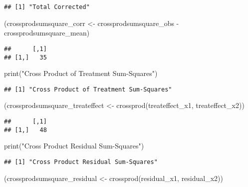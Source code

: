 \documentclass[
]{article}
\newenvironment{Shaded}{\begin{snugshade}}{\end{snugshade}}
\newcommand{\FunctionTok}[1]{\textcolor[rgb]{0.00,0.00,0.00}{#1}}
\newcommand{\NormalTok}[1]{#1}
\newcommand{\OtherTok}[1]{\textcolor[rgb]{0.56,0.35,0.01}{#1}}
\newcommand{\SpecialCharTok}[1]{\textcolor[rgb]{0.00,0.00,0.00}{#1}}
\newcommand{\StringTok}[1]{\textcolor[rgb]{0.31,0.60,0.02}{#1}}
\begin{document}
\begin{verbatim}
## [1] "Total Corrected"
\end{verbatim}

\begin{Shaded}
\begin{Highlighting}[]
\NormalTok{(crossprodsumsquare\_corr }\OtherTok{\textless{}{-}}\NormalTok{ crossprodsumsquare\_obs }\SpecialCharTok{{-}}\NormalTok{ crossprodsumsquare\_mean)}
\end{Highlighting}
\end{Shaded}

\begin{verbatim}
##      [,1]
## [1,]   35
\end{verbatim}

\begin{Shaded}
\begin{Highlighting}[]
\FunctionTok{print}\NormalTok{(}\StringTok{"Cross Product of Treatment Sum{-}Squares"}\NormalTok{)}
\end{Highlighting}
\end{Shaded}

\begin{verbatim}
## [1] "Cross Product of Treatment Sum-Squares"
\end{verbatim}

\begin{Shaded}
\begin{Highlighting}[]
\NormalTok{(crossprodsumsquare\_treateffect }\OtherTok{\textless{}{-}} \FunctionTok{crossprod}\NormalTok{(treateffect\_x1, treateffect\_x2))}
\end{Highlighting}
\end{Shaded}

\begin{verbatim}
##      [,1]
## [1,]   48
\end{verbatim}

\begin{Shaded}
\begin{Highlighting}[]
\FunctionTok{print}\NormalTok{(}\StringTok{"Cross Product Residual Sum{-}Squares"}\NormalTok{)}
\end{Highlighting}
\end{Shaded}

\begin{verbatim}
## [1] "Cross Product Residual Sum-Squares"
\end{verbatim}

\begin{Shaded}
\begin{Highlighting}[]
\NormalTok{(crossprodsumsquare\_residual }\OtherTok{\textless{}{-}} \FunctionTok{crossprod}\NormalTok{(residual\_x1, residual\_x2))}
\end{Highlighting}
\end{Shaded}
\end{document}
